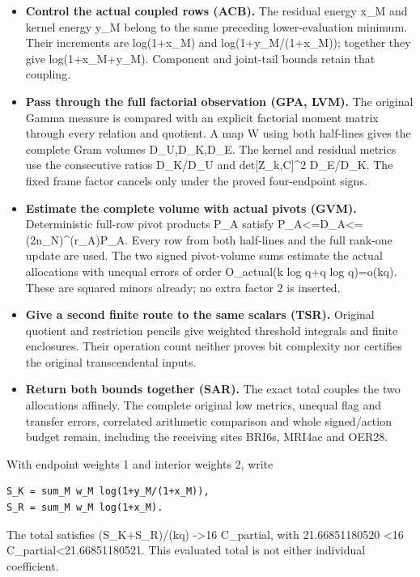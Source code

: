 \documentclass[
]{article}
\providecommand{\tightlist}{%
  \setlength{\itemsep}{0pt}\setlength{\parskip}{0pt}}
\begin{document}
\begin{itemize}
\tightlist
\item
  \textbf{Control the actual coupled rows (ACB).} The residual energy
  x\_M and kernel energy y\_M belong to the same preceding
  lower-evaluation minimum. Their increments are log(1+x\_M) and
  log(1+y\_M/(1+x\_M)); together they give log(1+x\_M+y\_M). Component
  and joint-tail bounds retain that coupling.
\item
  \textbf{Pass through the full factorial observation (GPA, LVM).} The
  original Gamma measure is compared with an explicit factorial moment
  matrix through every relation and quotient. A map W using both
  half-lines gives the complete Gram volumes D\_U,D\_K,D\_E. The kernel
  and residual metrics use the consecutive ratios D\_K/D\_U and
  \textbar det{[}Z\_k,C{]}\textbar\^{}2 D\_E/D\_K. The fixed frame
  factor cancels only under the proved four-endpoint signs.
\item
  \textbf{Estimate the complete volume with actual pivots (GVM).}
  Deterministic full-row pivot products P\_A satisfy
  P\_A\textless=D\_A\textless=(2n\_N)\^{}(r\_A)P\_A. Every row from both
  half-lines and the full rank-one update are used. The two signed
  pivot-volume sums estimate the actual allocations with unequal errors
  of order O\_actual(k log q+q log q)=o(kq). These are squared minors
  already; no extra factor 2 is inserted.
\item
  \textbf{Give a second finite route to the same scalars (TSR).}
  Original quotient and restriction pencils give weighted threshold
  integrals and finite enclosures. Their operation count neither proves
  bit complexity nor certifies the original transcendental inputs.
\item
  \textbf{Return both bounds together (SAR).} The exact total couples
  the two allocations affinely. The complete original low metrics,
  unequal flag and transfer errors, correlated arithmetic comparison and
  whole signed/action budget remain, including the receiving sites
  BRI6s, MRI4ac and OER28.
\end{itemize}

With endpoint weights 1 and interior weights 2, write

\begin{verbatim}
S_K = sum_M w_M log(1+y_M/(1+x_M)),
S_R = sum_M w_M log(1+x_M).
\end{verbatim}

The total satisfies (S\_K+S\_R)/(kq) -\textgreater16 C\_partial, with
21.66851180520 \textless16 C\_partial\textless21.66851180521. This
evaluated total is not either individual coefficient.
\end{document}
